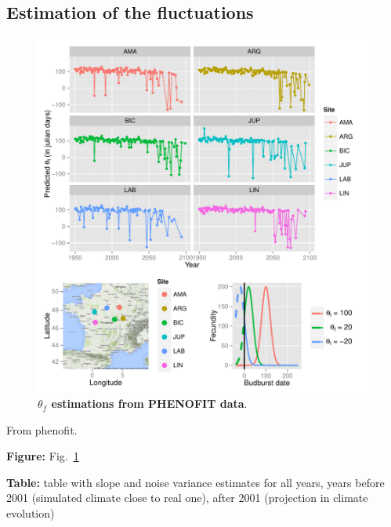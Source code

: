 \subsection*{Estimation of the fluctuations}

\begin{figure}[ht!]
	\centering
	\includegraphics[scale=1]{Figures/optsmaps.pdf}
	\caption{\textbf{$\theta_{f}$ estimations from PHENOFIT data}.}
	\label{fig:thetaf}
\end{figure}

From phenofit.

\textbf{Figure:} Fig.~\ref{fig:thetaf}

\textbf{Table:} table with slope and noise variance estimates for all years, years before 2001 (simulated climate close to real one), after 2001 (projection in climate evolution)